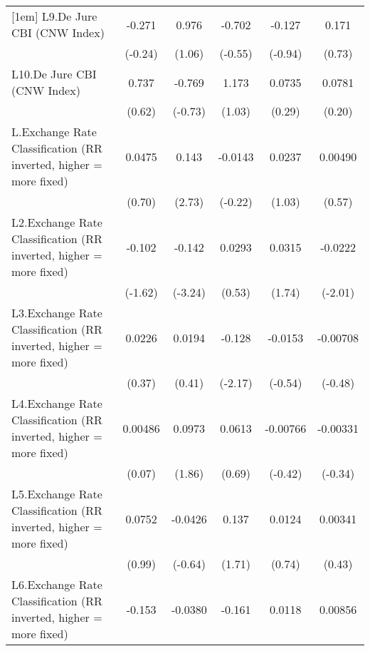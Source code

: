 {\begin{longtable}{l*{5}{c}}
[1em]
L9.De Jure CBI (CNW Index)&   -0.271         &    0.976         &   -0.702         &   -0.127         &    0.171         \\
                &  (-0.24)         &   (1.06)         &  (-0.55)         &  (-0.94)         &   (0.73)         \\
[1em]
L10.De Jure CBI (CNW Index)&    0.737         &   -0.769         &    1.173         &   0.0735         &   0.0781         \\
                &   (0.62)         &  (-0.73)         &   (1.03)         &   (0.29)         &   (0.20)         \\
[1em]
L.Exchange Rate Classification (RR inverted, higher = more fixed)&   0.0475         &    0.143\sym{**} &  -0.0143         &   0.0237         &  0.00490         \\
                &   (0.70)         &   (2.73)         &  (-0.22)         &   (1.03)         &   (0.57)         \\
[1em]
L2.Exchange Rate Classification (RR inverted, higher = more fixed)&   -0.102         &   -0.142\sym{**} &   0.0293         &   0.0315         &  -0.0222\sym{*}  \\
                &  (-1.62)         &  (-3.24)         &   (0.53)         &   (1.74)         &  (-2.01)         \\
[1em]
L3.Exchange Rate Classification (RR inverted, higher = more fixed)&   0.0226         &   0.0194         &   -0.128\sym{*}  &  -0.0153         & -0.00708         \\
                &   (0.37)         &   (0.41)         &  (-2.17)         &  (-0.54)         &  (-0.48)         \\
[1em]
L4.Exchange Rate Classification (RR inverted, higher = more fixed)&  0.00486         &   0.0973         &   0.0613         & -0.00766         & -0.00331         \\
                &   (0.07)         &   (1.86)         &   (0.69)         &  (-0.42)         &  (-0.34)         \\
[1em]
L5.Exchange Rate Classification (RR inverted, higher = more fixed)&   0.0752         &  -0.0426         &    0.137         &   0.0124         &  0.00341         \\
                &   (0.99)         &  (-0.64)         &   (1.71)         &   (0.74)         &   (0.43)         \\
[1em]
L6.Exchange Rate Classification (RR inverted, higher = more fixed)&   -0.153\sym{*}  &  -0.0380         &   -0.161\sym{***}&   0.0118         &  0.00856         \\

\end{longtable}}
